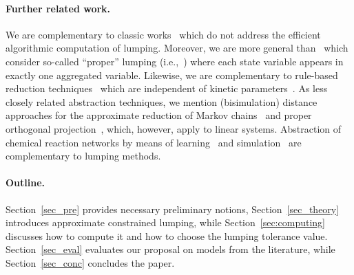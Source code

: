 \paragraph{\textbf{Further related work.}} We are complementary to classic works~\cite{LI1990977,LI199195} which do not address the efficient algorithmic computation of lumping. Moreover, we are more general than~\cite{iacobelli_lumpability_2013,tac15,DBLP:conf/qest/CardelliTTV18} which consider so-called ``proper'' lumping (i.e.,~\cite{Snowden:2017aa}) where each state variable appears in exactly one aggregated variable. %
Likewise, we are complementary to rule-based reduction techniques~\cite{Feret21042009} which are independent of kinetic parameters~\cite{concur15}. As less closely related abstraction techniques, we mention (bisimulation) distance approaches for the approximate reduction of Markov chains~\cite{DBLP:conf/tacas/BacciBLM13,DBLP:conf/concur/DacaHKP16} and proper orthogonal projection~\cite{antoulas}, which, however, apply to linear systems. Abstraction of chemical reaction networks by means of learning~\cite{DBLP:journals/iandc/RepinP21,DBLP:conf/cmsb/CairoliCB21} and simulation~\cite{DBLP:conf/cmsb/HelfrichCKM22} are complementary to lumping methods.


\paragraph{\textbf{Outline.}} Section~\ref{sec_pre} provides necessary preliminary notions, Section~\ref{sec_theory} introduces approximate constrained lumping, while Section~\ref{sec:computing} discusses how to compute it and how to choose the lumping tolerance value. Section~\ref{sec_eval} evaluates our proposal on models from the literature, while Section~\ref{sec_conc} concludes the paper.



